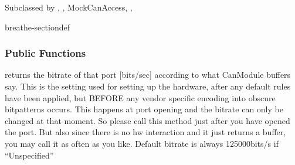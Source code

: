 \documentclass[a4paper,10pt,english]{sphinxmanual}
\begin{document}
\begin{fulllineitems}
\label{\detokenize{canports:_CPPv4N9CanModule10CCanAccessE}}%
\pysigstartmultiline
{}%
\pysigstopmultiline
\sphinxAtStartPar
Subclassed by {\hyperref[\detokenize{classestracing:classAnaCanScan}]{}}, {\hyperref[\detokenize{vendors/systec:classCSockCanScan}]{}}, MockCanAccess, {\hyperref[\detokenize{vendors/peak:classPKCanScan}]{}}, {\hyperref[\detokenize{classestracing:classSTCanScan}]{}}

\begin{sphinxuseclass}{breathe-sectiondef}\subsubsection*{Public Functions}

\begin{fulllineitems}
\label{\detokenize{canports:_CPPv4N9CanModule10CCanAccess14getPortBitrateEv}}%
\pysigstartmultiline
{}%
\pysigstopmultiline
\sphinxAtStartPar
returns the bitrate of that port {[}bits/sec{]} according to what CanModule buffers say. This is the setting used for setting up the hardware, after any default rules have been applied, but BEFORE any vendor specific encoding into obscure bitpatterns occurs. This happens at port opening and the bitrate can only be changed at that moment. So please call this method just after you have opened the port. But also since there is no hw interaction and it just returns a buffer, you may call it as often as you like. Default bitrate is always 125000bits/s if “Unspecified” 

\end{fulllineitems}


\end{sphinxuseclass}
\end{fulllineitems}
\end{document}
